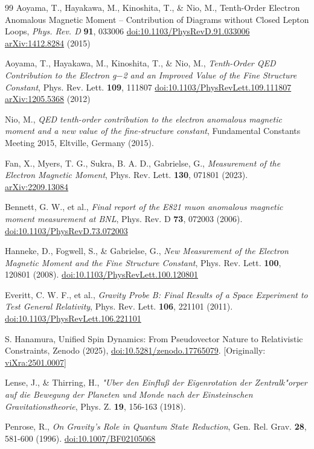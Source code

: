 \documentclass[%
 reprint,
 amsmath,amssymb,
 aps,
]{revtex4-1}
\numberwithin{equation}{section}%
\begin{document}
\begin{thebibliography}{99}
Aoyama, T., Hayakawa, M., Kinoshita, T., \& Nio, M.,
Tenth-Order Electron Anomalous Magnetic Moment -- Contribution of Diagrams without Closed Lepton Loops,
\textit{Phys. Rev. D} \textbf{91}, 033006
\href{https://doi.org/10.1103/PhysRevD.91.033006}{doi:10.1103/PhysRevD.91.033006}
\href{https://arxiv.org/abs/1412.8284}{arXiv:1412.8284} (2015)

Aoyama, T., Hayakawa, M., Kinoshita, T., \& Nio, M.,
\textit{Tenth-Order QED Contribution to the Electron g$-$2 and an Improved Value of the Fine Structure Constant},
Phys. Rev. Lett. \textbf{109}, 111807
\href{https://doi.org/10.1103/PhysRevLett.109.111807}{doi:10.1103/PhysRevLett.109.111807}
\href{https://arxiv.org/abs/1205.5368}{arXiv:1205.5368} (2012)

Nio, M.,
\textit{QED tenth-order contribution to the electron anomalous magnetic moment and a new value of the fine-structure constant},
Fundamental Constants Meeting 2015, Eltville, Germany (2015).

Fan, X., Myers, T. G., Sukra, B. A. D., Gabrielse, G.,
\textit{Measurement of the Electron Magnetic Moment},
Phys. Rev. Lett. \textbf{130}, 071801 (2023).
\href{https://arxiv.org/abs/2209.13084}{arXiv:2209.13084}

Bennett, G. W., et al.,
\textit{Final report of the E821 muon anomalous magnetic moment measurement at BNL},
Phys. Rev. D \textbf{73}, 072003 (2006).
\href{https://doi.org/10.1103/PhysRevD.73.072003}{doi:10.1103/PhysRevD.73.072003}

Hanneke, D., Fogwell, S., \& Gabrielse, G.,
\textit{New Measurement of the Electron Magnetic Moment and the Fine Structure Constant},
Phys. Rev. Lett. \textbf{100}, 120801 (2008).
\href{https://doi.org/10.1103/PhysRevLett.100.120801}{doi:10.1103/PhysRevLett.100.120801}

Everitt, C. W. F., et al.,
\textit{Gravity Probe B: Final Results of a Space Experiment to Test General Relativity},
Phys. Rev. Lett. \textbf{106}, 221101 (2011).
\href{https://doi.org/10.1103/PhysRevLett.106.221101}{doi:10.1103/PhysRevLett.106.221101}

S. Hanamura, Unified Spin Dynamics: From Pseudovector Nature to Relativistic Constraints, Zenodo (2025), \href{https://doi.org/10.5281/zenodo.17765079}{doi:10.5281/zenodo.17765079}. [Originally: \href{https://vixra.org/abs/2501.0007}{viXra:2501.0007}]

Lense, J., \& Thirring, H.,
\textit{"Uber den Einflu\ss{} der Eigenrotation der Zentralk"orper auf die Bewegung der Planeten und Monde nach der Einsteinschen Gravitationstheorie},
Phys. Z. \textbf{19}, 156-163 (1918).

Penrose, R.,
\textit{On Gravity's Role in Quantum State Reduction},
Gen. Rel. Grav. \textbf{28}, 581-600 (1996).
\href{https://doi.org/10.1007/BF02105068}{doi:10.1007/BF02105068}

\end{thebibliography}
\end{document}
